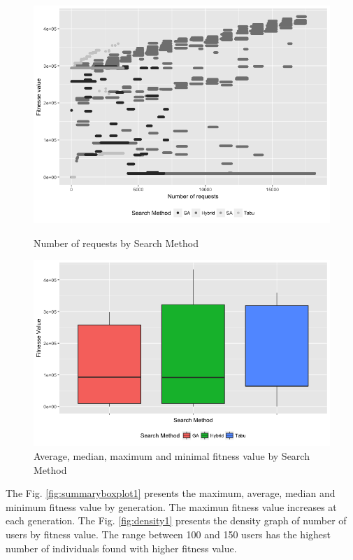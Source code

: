 \documentclass[times]{stvrauth}
\begin{document}
\begin{figure}[h]
\begin{minipage}{.5\textwidth}
\centering
\includegraphics[width=1\textwidth]{./images/experiment1-3-bw.png}
\caption{Number of requests by Search Method}
\label{fig:numberofrequestsbysearchmethod}
\end{minipage}
\begin{minipage}{.5\textwidth}
\centering
\includegraphics[width=1\textwidth]{./images/experiment1-4.png}
\caption{Average, median, maximum and minimal fitness value by Search Method}
\label{fig:boxplot1}
\end{minipage}
\end{figure}

The Fig. \ref{fig:summaryboxplot1} presents the maximum, average, median and minimum fitness value by generation. The maximun fitness value increases at each generation. The Fig. \ref{fig:density1} presents the density graph of number of users by fitness value. The range between 100 and 150 users has the highest number of individuals found with higher fitness value.
\end{document}
